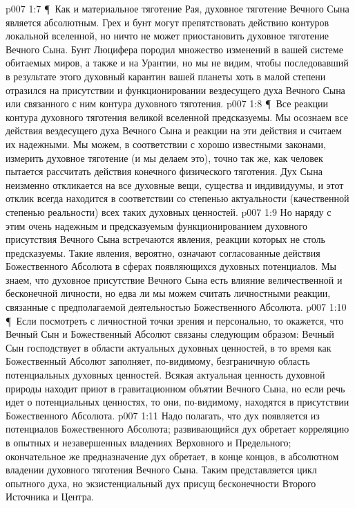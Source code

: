 \vs p007 1:7 \P\ Как и материальное тяготение Рая, духовное тяготение Вечного Сына является абсолютным. Грех и бунт могут препятствовать действию контуров локальной вселенной, но ничто не может приостановить духовное тяготение Вечного Сына. Бунт Люцифера породил множество изменений в вашей системе обитаемых миров, а также и на Урантии, но мы не видим, чтобы последовавший в результате этого духовный карантин вашей планеты хоть в малой степени отразился на присутствии и функционировании вездесущего духа Вечного Сына или связанного с ним контура духовного тяготения.
\vs p007 1:8 \P\ Все реакции контура духовного тяготения великой вселенной предсказуемы. Мы осознаем все действия вездесущего духа Вечного Сына и реакции на эти действия и считаем их надежными. Мы можем, в соответствии с хорошо известными законами, измерить духовное тяготение (и мы делаем это), точно так же, как человек пытается рассчитать действия конечного физического тяготения. Дух Сына неизменно откликается на все духовные вещи, существа и индивидуумы, и этот отклик всегда находится в соответствии со степенью актуальности (качественной степенью реальности) всех таких духовных ценностей.
\vs p007 1:9 Но наряду с этим очень надежным и предсказуемым функционированием духовного присутствия Вечного Сына встречаются явления, реакции которых не столь предсказуемы. Такие явления, вероятно, означают согласованные действия Божественного Абсолюта в сферах появляющихся духовных потенциалов. Мы знаем, что духовное присутствие Вечного Сына есть влияние величественной и бесконечной личности, но едва ли мы можем считать личностными реакции, связанные с предполагаемой деятельностью Божественного Абсолюта.
\vs p007 1:10 \P\ Если посмотреть с личностной точки зрения и персонально, то окажется, что Вечный Сын и Божественный Абсолют связаны следующим образом: Вечный Сын господствует в области актуальных духовных ценностей, в то время как Божественный Абсолют заполняет, по\hyp{}видимому, безграничную область потенциальных духовных ценностей. Всякая актуальная ценность духовной природы находит приют в гравитационном объятии Вечного Сына, но если речь идет о потенциальных ценностях, то они, по\hyp{}видимому, находятся в присутствии Божественного Абсолюта.
\vs p007 1:11 Надо полагать, что дух появляется из потенциалов Божественного Абсолюта; развивающийся дух обретает корреляцию в опытных и незавершенных владениях Верховного и Предельного; окончательное же предназначение дух обретает, в конце концов, в абсолютном владении духовного тяготения Вечного Сына. Таким представляется цикл опытного духа, но экзистенциальный дух присущ бесконечности Второго Источника и Центра.

